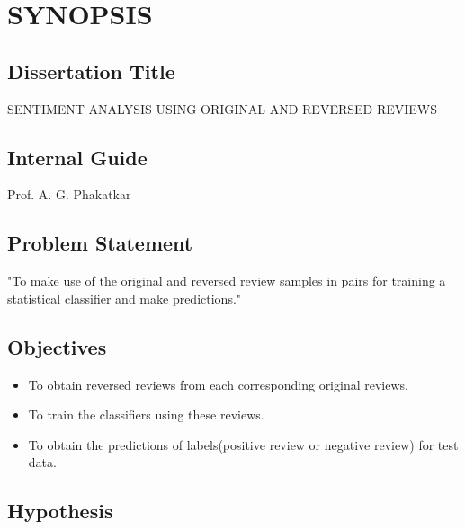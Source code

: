 \documentclass[oneside,a4paper,12pt]{pictreport}
\begin{document}
\setlength{\parindent}{11mm}
\chapter{SYNOPSIS}


\section{Dissertation Title}
SENTIMENT ANALYSIS USING ORIGINAL AND REVERSED REVIEWS



\section{Internal Guide}
Prof. A. G. Phakatkar



\section{Problem Statement}
\label{sec:problem_def}
"To make use of the original and reversed review samples in pairs for training a
statistical classifier and make predictions."

\section{Objectives}
\begin{itemize}
    \item To obtain reversed reviews from each corresponding original reviews.
    \item To train the classifiers  using these reviews.
    \item To obtain the predictions of labels(positive review or negative review) for test data.
\end{itemize}

\section{Hypothesis}
\end{document}
